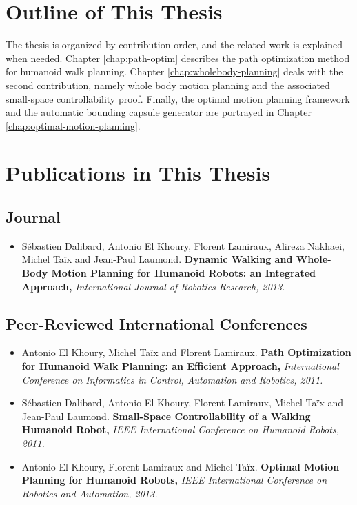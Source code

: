 \section{Outline of This Thesis}

The thesis is organized by contribution order, and the related work is
explained when needed. Chapter \ref{chap:path-optim} describes the
path optimization method for humanoid walk planning. Chapter
\ref{chap:wholebody-planning} deals with the second contribution,
namely whole body motion planning and the associated small-space
controllability proof. Finally, the optimal motion planning framework
and the automatic bounding capsule generator are portrayed in Chapter
\ref{chap:optimal-motion-planning}.

\section{Publications in This Thesis}

\subsection*{Journal}

\begin{itemize}
\item S\'ebastien Dalibard, Antonio El Khoury, Florent Lamiraux,
  Alireza Nakhaei, Michel Ta\"ix and Jean-Paul
  Laumond. \textbf{Dynamic Walking and Whole-Body Motion Planning for
    Humanoid Robots: an Integrated Approach,} \textit{International
    Journal of Robotics Research, 2013.}
\end{itemize}

\subsection*{Peer-Reviewed International Conferences}
\begin{itemize}
\item Antonio El Khoury, Michel Ta\"ix and Florent
  Lamiraux. \textbf{Path Optimization for Humanoid Walk Planning: an
    Efficient Approach,} \textit{International Conference on
    Informatics in Control, Automation and Robotics, 2011.}

\item S\'ebastien Dalibard, Antonio El Khoury, Florent Lamiraux,
  Michel Ta\"ix and Jean-Paul Laumond. \textbf{Small-Space
    Controllability of a Walking Humanoid Robot,} \textit{IEEE
    International Conference on Humanoid Robots, 2011.}

\item Antonio El Khoury, Florent Lamiraux and Michel
  Ta\"ix. \textbf{Optimal Motion Planning for Humanoid Robots,}
  \textit{IEEE International Conference on Robotics and Automation,
    2013.}
\end{itemize}
